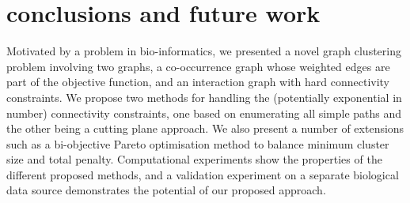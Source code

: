 \documentclass[conference]{IEEEtran}
\begin{document}
\section{conclusions and future work}
\label{sec:conclusion}
Motivated by a problem in bio-informatics, we presented a novel graph clustering problem involving two graphs, a co-occurrence graph whose weighted edges are part of the objective function, and an interaction graph with hard connectivity constraints. We propose two methods for handling the (potentially exponential in number) connectivity constraints, one based on enumerating all simple paths and the other being a cutting plane approach. We also present a number of extensions such as a bi-objective Pareto optimisation method to balance minimum cluster size and total penalty. Computational experiments show the properties of the different proposed methods, and a validation experiment on a separate biological data source demonstrates the potential of our proposed approach.



\end{document}
